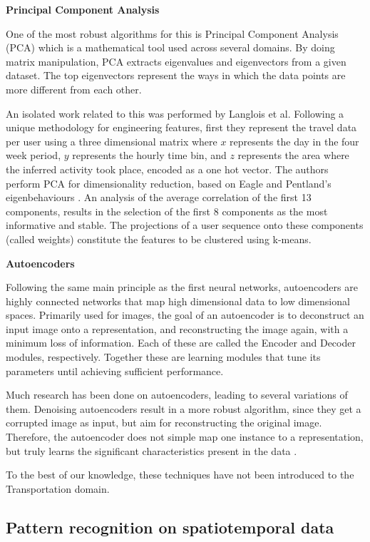 \documentclass{article}
\begin{document}
\textbf{Principal Component Analysis}

One of the most robust algorithms for this is Principal Component Analysis (PCA) which is a mathematical tool used across several domains. By doing matrix manipulation, PCA extracts eigenvalues and eigenvectors from a given dataset. The top eigenvectors represent the ways in which the data points are more different from each other.

An isolated work related to this was performed by Langlois et al. Following a unique methodology for engineering features, first they represent the travel data per user using a three dimensional matrix where $x$ represents the day in the four week period, $y$ represents the hourly time bin, and $z$ represents the area where the inferred activity took place, encoded as a one hot vector. The authors perform PCA for dimensionality reduction, based on Eagle and Pentland's eigenbehaviours \cite{eagle2009eigenbehaviors}. An analysis of the average correlation of the first 13 components, results in the selection of the first 8 components as the most informative and stable. The projections of a user sequence onto these components (called weights) constitute the features to be clustered using k-means. \cite{langlois2016inferring}

\textbf{Autoencoders}

Following the same main principle as the first neural networks, autoencoders are highly connected networks that map high dimensional data to low dimensional spaces. Primarily used for images, the goal of an autoencoder is to deconstruct an input image onto a representation, and reconstructing the image again, with a minimum loss of information. Each of these are called the Encoder and Decoder modules, respectively. Together these are learning modules that tune its parameters until achieving sufficient performance. 

Much research has been done on autoencoders, leading to several variations of them. Denoising autoencoders result in a more robust algorithm, since they get a corrupted image as input, but aim for reconstructing the original image. Therefore, the autoencoder does not simple map one instance to a representation, but truly learns the significant characteristics present in the data \cite{nithin2015generic}.  

To the best of our knowledge, these techniques have not been introduced to the Transportation domain. 


\subsection{Pattern recognition on spatiotemporal data}
\end{document}
